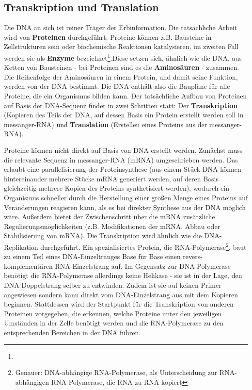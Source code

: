 \subsection{Transkription und Translation}
Die DNA an sich ist reiner Träger der Erbinformation. Die tatsächliche Arbeit wird von \textbf{Proteinen} durchgeführt. Proteine können z.B. Bausteine in Zellstrukturen sein oder biochemische Reaktionen katalysieren, im zweiten Fall werden sie als \textbf{Enzyme} bezeichnet\footnote{}.Diese setzen sich, ähnlich wie die DNA, aus Ketten von Bausteinen - bei Proteinen sind es die \textbf{Aminosäuren} - zusammen. Die Reihenfolge der Aminosäuren in einem Protein, und damit seine Funktion, werden von der DNA bestimmt. Die DNA enthält also die Baupläne für alle Proteine, die ein Organismus bilden kann. Der tatsächliche Aufbau von Proteinen auf Basis der DNA-Sequenz findet in zwei Schritten statt: Der \textbf{Transkription} (Kopieren des Teils der DNA, auf dessen Basis ein Protein erstellt werden soll in messanger-RNA) und \textbf{Translation} (Erstellen eines Proteins aus der messanger-RNA).

Proteine können nicht direkt auf Basis von DNA erstellt werden. Zunächst muss die relevante Sequenz in messanger-RNA (mRNA) umgeschrieben werden. Das erlaubt eine parallelisierung der Proteinsynthese (aus einem Stück DNA können hintereinander mehrere Stücke mRNA generiert werden, auf deren Basis gleichzeitig mehrere Kopien des Proteins synthetisiert werden), wodurch ein Organismus schneller durch die Herstellung einer großen Menge eines Proteins auf Veränderungen reagieren kann, als es bei direkter Synthese aus der DNA möglich wäre. Außerdem bietet der Zwischenschritt über die mRNA zusätzliche Regulierungsmöglichkeiten (z.B. Modifikationen der mRNA, Abbau oder Stabilisierung von mRNA). Die Transkription wird ähnlich wie die DNA-Replikation durchgeführt. Ein spezialisiertes Protein, die RNA-Polymerase\footnote{Genauer: DNA-abhängige RNA-Polymerase, als Unterscheidung zur RNA-abhängigen RNA-Polymerase, die RNA zu RNA kopiert}, baut zu einem Teil eines DNA-Einzeltranges Base für Base einen revers-komplementären RNA-Einzelstrang auf. Im Gegensatz zur DNA-Polymerase benötigt die RNA-Polymerase allerdings keine Helikase - sie ist in der Lage, den DNA-Doppelstrang selber zu entwinden. Zudem ist sie auf keinen Primer angewiesen sondern kann direkt vom DNA-Einzelstrang aus mit dem Kopieren beginnen. Stattdessen wird der Startpunkt für die Transkription von anderen Proteinen vorgegeben, die erkennen, welche Proteine unter den jeweiligen Umständen in der Zelle benötigt werden und die RNA-Polymerase zu den entsprechenden Bereichen in der DNA führen. 


